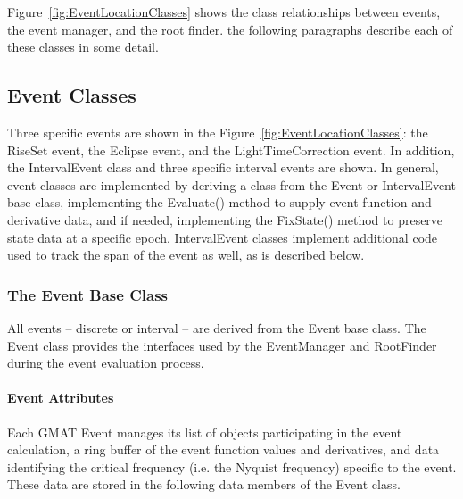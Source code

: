 Figure~\ref{fig:EventLocationClasses} shows the class relationships between events, the event
manager, and the root finder.  the following paragraphs describe each of these classes in some
detail.

\subsection{Event Classes}

Three specific events are shown in the Figure~\ref{fig:EventLocationClasses}: the RiseSet event, the Eclipse event, and the LightTimeCorrection event.  In addition, the IntervalEvent class and three specific interval events are shown.  In general, event classes are implemented by deriving a class from the Event or IntervalEvent base class, implementing the Evaluate() method to supply event function and derivative data, and if needed, implementing the FixState() method to preserve state data at a specific epoch.  IntervalEvent classes implement additional code used to track the span of the event as well, as is described below.

\subsubsection{The Event Base Class}

All events -- discrete or interval -- are derived from the Event base class.  The Event class provides the interfaces used by the EventManager and RootFinder during the event evaluation process.

\paragraph{Event Attributes}  Each GMAT Event manages its list of objects participating in the event calculation, a ring buffer of the event function values and derivatives, and data identifying the critical frequency (i.e. the Nyquist frequency) specific to the event.  These data are stored in the following data members of the Event class.


